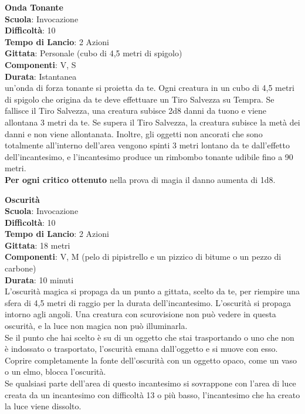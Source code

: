 \begin{multicols}{2}
\medskip\textbf{Onda Tonante}\\
\textbf{Scuola}: Invocazione\\
\textbf{Difficoltà}:  10\\
\textbf{Tempo di Lancio}: 2 Azioni\\
\textbf{Gittata}: Personale (cubo di 4,5 metri di spigolo)\\
\textbf{Componenti}: V, S\\
\textbf{Durata}: Istantanea\\
un'onda di forza tonante si proietta da te. Ogni creatura in un cubo di 4,5 metri di spigolo che origina da te deve effettuare un Tiro Salvezza su Tempra. Se fallisce il Tiro Salvezza, una creatura subisce 2d8 danni da tuono e viene allontana 3 metri da te. Se supera il Tiro Salvezza, la creatura subisce la metà dei danni e non viene allontanata. Inoltre, gli oggetti non ancorati che sono totalmente all'interno dell'area vengono spinti 3 metri lontano da te dall'effetto dell'incantesimo, e l'incantesimo produce un rimbombo tonante udibile fino a 90 metri.\\
\textbf{Per ogni critico ottenuto} nella prova di magia il danno aumenta di 1d8.

\medskip\textbf{Oscurità}\\
\textbf{Scuola}: Invocazione\\
\textbf{Difficoltà}:  10\\
\textbf{Tempo di Lancio}: 2 Azioni\\
\textbf{Gittata}: 18 metri\\
\textbf{Componenti}: V, M (pelo di pipistrello e un pizzico di bitume o un pezzo di carbone)\\
\textbf{Durata}: 10 minuti\\
L’oscurità magica si propaga da un punto a gittata, scelto da te, per riempire una sfera di 4,5 metri di raggio per la durata dell'incantesimo. L’oscurità si propaga intorno agli angoli. Una creatura con scurovisione non può vedere in questa oscurità, e la luce non magica non può illuminarla.\\
Se il punto che hai scelto è su di un oggetto che stai trasportando o uno che non è indossato o trasportato, l’oscurità emana dall'oggetto e si muove con esso. Coprire completamente la fonte dell'oscurità con un oggetto opaco, come un vaso o un elmo, blocca l’oscurità.\\
Se qualsiasi parte dell'area di questo incantesimo si sovrappone con l’area di luce creata da un incantesimo con difficoltà 13 o più basso, l'incantesimo che ha creato la luce viene dissolto.


\end{multicols}
